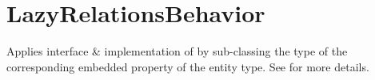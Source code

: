 \section{LazyRelationsBehavior}
\label{feature:LazyRelationsBehavior}
\ClearAPI
Applies interface \& implementation of  by sub-classing the type of the corresponding embedded property of the entity type. See  for more details.
\TODO